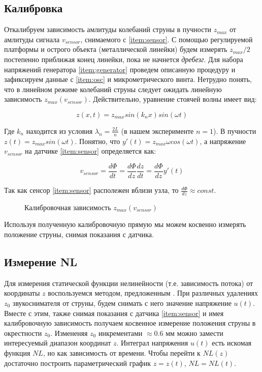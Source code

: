 \documentclass{article}
\begin{document}
\subsection{Калибровка}

Откалибруем зависимость амлитуды колебаний струны в пучности $z_{max}$ от амлитуды сигнала $v_{sensor}$, снимаемого с \ref{item:sensor}.
С помощью регулируемой платформы и острого объекта (металлической линейки) будем измерять $z_{max}/2$ постепенно приближая
конец линейки, пока не начнется \textit{дребезг}. Для набора напряжений генератора \ref{item:generator} проведем описанную процедуру
и зафиксируем данные с \ref{item:osc} и микрометрического винта. Нетрудно понять, что в линейном режиме колебаний струны следует ожидать
линейную зависимость $z_{max}(v_{sensor})$. Действительно, уравнение стоячей волны имеет вид:

\begin{equation}
    z(x, t) = z_{max} sin(k_n x) sin(\omega t)
\end{equation}

Где $k_n$ находится из условия $\lambda_n = \frac{2 L}{n}$ (в нашем эксперименте $n = 1$).
В пучности $z(t) = z_{max} sin(\omega t)$. Понятно, что $y'(t) = z_{max} \omega cos(\omega t)$, а напряжение $v_{sensor}$
на датчике \ref{item:sensor} определяется как:

\begin{equation}
    v_{sensor} = \frac{d \Phi}{dt} = \frac{d \Phi}{dz} \frac{dz}{dt} = \frac{d \Phi}{dz} y'(t)
\end{equation}

Так как сенсор \ref{item:sensor} располежен вблизи узла, то $\frac{d \Phi}{dz} \approx const$.

\begin{figure}[h]
    \centering
    
    \caption{Калибровочная зависимость $z_{max}(v_{sensor})$}
    \label{fig:model}
\end{figure}

Используя полученную калибровочную прямую мы можем косвенно измерять положение струны,
снимая показания с датчика.

\pagebreak

\subsection{Измерение NL}

Для измерения статической функции нелинейности (т.е. зависимость потока) от координаты $z$
воспользуемся методом, предложенным \cite{novak:hal-02512148}. При различных удалениях $z_0$ звукоснимателя от струны,
будем снимать с него значение напряжение $u(t)$. Вместе с этим, также снимая показания с датчика \ref{item:sensor} и имея
калибровочную зависимость получаем косвенное измерение положения струны в окрестности $z_0$. Измененяя $z_0$ инкрементами
$\approx 0.6$ мм можно замести интересуемый диапазон координат $z$. Интеграл напряжения $u(t)$ есть искомая функция $NL$, но как
зависимость от времени. Чтобы перейти к $NL(z)$ достаточно построить параметрический график $z = z(t)$, $NL = NL(t)$.
\end{document}
